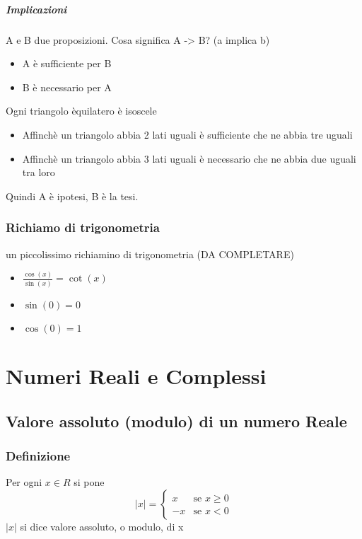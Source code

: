 \documentclass[12pt, a4paper, openany]{book}
\begin{document}
\paragraph*{Implicazioni}
A e B due proposizioni. Cosa significa A -> B? (a implica b)
\begin{itemize}
    \item A è sufficiente per B
    \item B è necessario per A
\end{itemize}
Ogni triangolo èquilatero è isoscele
\begin{itemize}
    \item Affinchè un triangolo abbia 2 lati uguali è sufficiente che ne abbia tre uguali
    \item Affinchè un triangolo abbia 3 lati uguali è necessario che ne abbia due uguali tra loro
\end{itemize}
Quindi A è ipotesi, B è la tesi.

\subsection*{Richiamo di trigonometria}
un piccolissimo richiamino di trigonometria (DA COMPLETARE)
\begin{itemize}
    \item $\frac{\cos(x)}{\sin(x)} = \cot(x)$
    \item $\sin(0) = 0$
    \item $\cos(0) = 1$
\end{itemize}

\chapter{Numeri Reali e Complessi}

\section{Valore assoluto (modulo) di un numero Reale}

\subsection*{Definizione} Per ogni $x \in R$ si pone
\begin{equation}
    |x| = \begin{cases}
        x & \text{se $x \geq 0$}\\
        -x & \text{se $x < 0$}
    \end{cases}
\end{equation}
$|x|$ si dice valore assoluto, o modulo, di x\\
\end{document}
